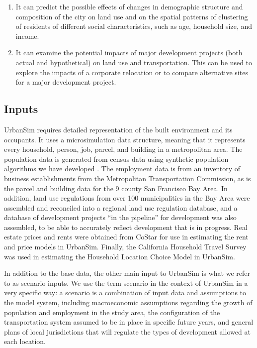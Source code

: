 \begin{enumerate}
\item It can predict the possible effects of changes in demographic structure and composition of the city on land use and on the spatial patterns of clustering of residents of different social characteristics, such as age, household size, and income.

\item It can examine the potential impacts of major development projects (both actual and hypothetical) on land use and transportation. This can be used to explore the impacts of a corporate relocation or to compare alternative sites for a major development project.
\end{enumerate}


\subsection{Inputs}

UrbanSim requires detailed representation of the built environment and its occupants.  It uses a microsimulation data structure, meaning that it represents every household, person, job, parcel, and building in a metropolitan area. The population data is generated from census data using synthetic population algorithms we have developed \citep{ye-trb-2009}.  The employment data is from an inventory of business establishments from the Metropolitan Transportation Commission, as is the parcel and building data for the 9 county San Francisco Bay Area. In addition, land use regulations from over 100 municipalities in the Bay Area were assembled and reconciled into a regional land use regulation database, and a database of development projects \enquote{in the pipeline} for development was also assembled, to be able to accurately reflect development that is in progress.  Real estate prices and rents were obtained from CoStar for use in estimating the rent and price models in UrbanSim.  Finally, the California Household Travel Survey was used in estimating the Household Location Choice Model in UrbanSim.

In addition to the base data, the other main input to UrbanSim is what we refer to as scenario inputs. We use the term scenario in the context of UrbanSim in a very specific way: a scenario is a combination of input data and assumptions to the model system, including macroeconomic assumptions regarding the growth of population and employment in the study area, the configuration of the transportation system assumed to be in place in specific future years, and general plans of local jurisdictions that will regulate the types of development allowed at each location.


